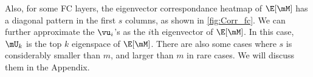Also, for some FC layers, the eigenvector correspondance heatmap of $\E[\mM]$ has a diagonal pattern in the first $s$ columns, as shown in \cref{fig:Corr_fc}. We can further approximate the $\vu_i$'s as the $i$th eigenvector of $\E[\mM]$. In this case, $\mU_k$ is the top $k$ eigenspace of $\E[\mM]$. There are also some cases where $s$ is considerably smaller than $m$, and larger than $m$ in rare cases. We will discuss them in the Appendix.